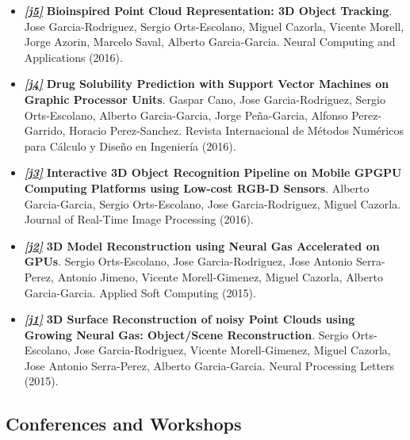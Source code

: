 \documentclass[8pt]{article}
\begin{document}
\begin{itemize}
    \item \emph{\textbf{\href{http://link.springer.com/article/10.1007/s00521-016-2585-0}{[j5]}}} \textbf{Bioinspired Point Cloud Representation: 3D Object Tracking}. Jose Garcia-Rodriguez, Sergio Orts-Escolano, Miguel Cazorla, Vicente Morell, Jorge Azorin, Marcelo Saval, Alberto Garcia-Garcia. Neural Computing and Applications (2016).
    \item \emph{\textbf{\href{http://www.sciencedirect.com/science/article/pii/S0213131516000067}{[j4]}}} \textbf{Drug Solubility Prediction with Support Vector Machines on Graphic Processor Units}. Gaspar Cano, Jose Garcia-Rodriguez, Sergio Orts-Escolano, Alberto Garcia-Garcia, Jorge Peña-Garcia, Alfonso Perez-Garrido, Horacio Perez-Sanchez. Revista Internacional de Métodos Numéricos para Cálculo y Diseño en Ingeniería (2016).
    \item \emph{\textbf{\href{http://link.springer.com/article/10.1007/s11554-016-0607-x}{[j3]}}} \textbf{Interactive 3D Object Recognition Pipeline on Mobile GPGPU Computing Platforms using Low-cost RGB-D Sensors}. Alberto Garcia-Garcia, Sergio Orts-Escolano, Jose Garcia-Rodriguez, Miguel Cazorla. Journal of Real-Time Image Processing (2016).
    \item \emph{\textbf{\href{http://www.sciencedirect.com/science/article/pii/S1568494615002008}{[j2]}}} \textbf{3D Model Reconstruction using Neural Gas Accelerated on GPUs}. Sergio Orts-Escolano, Jose Garcia-Rodriguez, Jose Antonio Serra-Perez, Antonio Jimeno, Vicente Morell-Gimenez, Miguel Cazorla, Alberto Garcia-Garcia. Applied Soft Computing (2015).
    \item \emph{\textbf{\href{http://link.springer.com/article/10.1007/s11063-015-9421-x}{[j1]}}} \textbf{3D Surface Reconstruction of noisy Point Clouds using Growing Neural Gas: Object/Scene Reconstruction}. Sergio Orts-Escolano, Jose Garcia-Rodriguez, Vicente Morell-Gimenez, Miguel Cazorla, Jose Antonio Serra-Perez, Alberto Garcia-Garcia. Neural Processing Letters (2015).
\end{itemize}

\subsection*{Conferences and Workshops}
\end{document}
